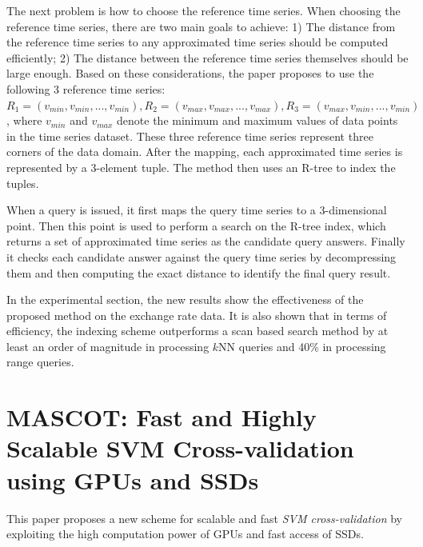 \documentclass[paper=a4, fontsize=18pt]{article} %
\numberwithin{equation}{section} %
\numberwithin{figure}{section} %
\numberwithin{table}{section} %
\begin{document}
The next problem is how to choose the reference time series. When choosing the reference time series, there are two main goals to achieve: 1) The distance from the reference time series to any approximated time series should be computed efficiently; 2) The distance between the reference time series themselves should be large enough. Based on these considerations, the paper proposes to use the following 3 reference time series: $R_1 = (v_{min}, v_{min}, ..., v_{min}), R_2 = (v_{max}, v_{max}, ..., v_{max}), R_3 = (v_{max}, v_{min}, ..., v_{min})$, where $v_{min}$ and $v_{max}$ denote the minimum and maximum values of data points in the time series dataset. These three reference time series represent three corners of the data domain. After the mapping, each approximated time series is represented by a 3-element tuple. The method then uses an R-tree to index the tuples.

When a query is issued, it first maps the query time series to a 3-dimensional point. Then this point is used to perform a search on the R-tree index, which returns a set of approximated time series as the candidate query answers. Finally it checks each candidate answer against the query time series by decompressing them and then computing the exact distance to identify the final query result.

In the experimental section, the new results show the effectiveness of the proposed method on the exchange rate data. It is also shown that in terms of efficiency, the indexing scheme outperforms a scan based search method by at least an order of magnitude in processing $k$NN queries and 40\% in processing range queries.

\section{MASCOT: Fast and Highly Scalable SVM Cross-validation using GPUs and SSDs \cite{WZRQT14}}\label{sec:MASCOT}

This paper proposes a new scheme for scalable and fast \emph{SVM cross-validation} by exploiting the high computation power of GPUs and fast access of SSDs.
\end{document}
